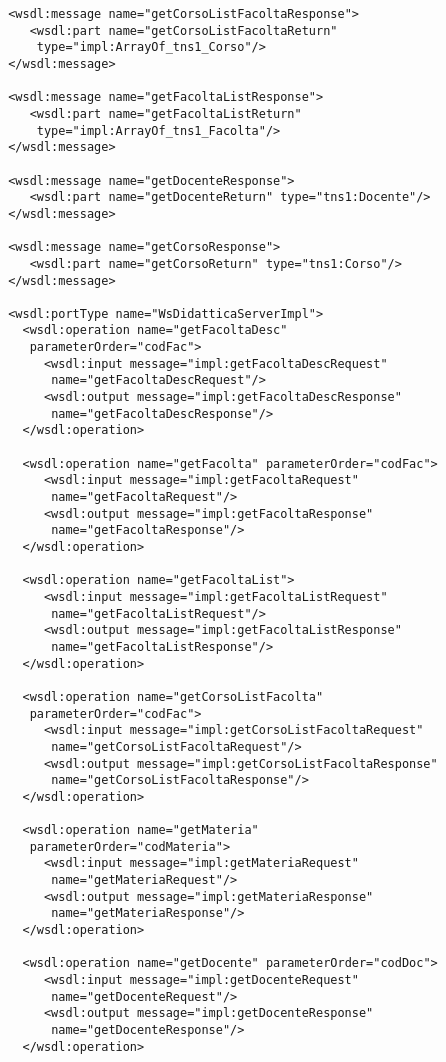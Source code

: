 \begin{small}
\begin{verbatim}
 <wsdl:message name="getCorsoListFacoltaResponse">
    <wsdl:part name="getCorsoListFacoltaReturn"
     type="impl:ArrayOf_tns1_Corso"/>
 </wsdl:message>

 <wsdl:message name="getFacoltaListResponse">
    <wsdl:part name="getFacoltaListReturn"
     type="impl:ArrayOf_tns1_Facolta"/>
 </wsdl:message>

 <wsdl:message name="getDocenteResponse">
    <wsdl:part name="getDocenteReturn" type="tns1:Docente"/>
 </wsdl:message>

 <wsdl:message name="getCorsoResponse">
    <wsdl:part name="getCorsoReturn" type="tns1:Corso"/>
 </wsdl:message>

 <wsdl:portType name="WsDidatticaServerImpl">
   <wsdl:operation name="getFacoltaDesc"
    parameterOrder="codFac">
      <wsdl:input message="impl:getFacoltaDescRequest"
       name="getFacoltaDescRequest"/>
      <wsdl:output message="impl:getFacoltaDescResponse"
       name="getFacoltaDescResponse"/>
   </wsdl:operation>

   <wsdl:operation name="getFacolta" parameterOrder="codFac">
      <wsdl:input message="impl:getFacoltaRequest"
       name="getFacoltaRequest"/>
      <wsdl:output message="impl:getFacoltaResponse"
       name="getFacoltaResponse"/>
   </wsdl:operation>

   <wsdl:operation name="getFacoltaList">
      <wsdl:input message="impl:getFacoltaListRequest"
       name="getFacoltaListRequest"/>
      <wsdl:output message="impl:getFacoltaListResponse"
       name="getFacoltaListResponse"/>
   </wsdl:operation>

   <wsdl:operation name="getCorsoListFacolta"
    parameterOrder="codFac">
      <wsdl:input message="impl:getCorsoListFacoltaRequest"
       name="getCorsoListFacoltaRequest"/>
      <wsdl:output message="impl:getCorsoListFacoltaResponse"
       name="getCorsoListFacoltaResponse"/>
   </wsdl:operation>

   <wsdl:operation name="getMateria"
    parameterOrder="codMateria">
      <wsdl:input message="impl:getMateriaRequest"
       name="getMateriaRequest"/>
      <wsdl:output message="impl:getMateriaResponse"
       name="getMateriaResponse"/>
   </wsdl:operation>

   <wsdl:operation name="getDocente" parameterOrder="codDoc">
      <wsdl:input message="impl:getDocenteRequest"
       name="getDocenteRequest"/>
      <wsdl:output message="impl:getDocenteResponse"
       name="getDocenteResponse"/>
   </wsdl:operation>


\end{verbatim}
\end{small}
